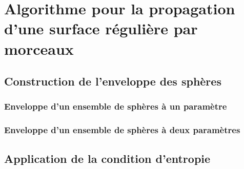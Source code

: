 \chapter{Algorithme pour la propagation d'une surface régulière par morceaux}

\section{Construction de l'enveloppe des sphères}

\subsection{Enveloppe d'un ensemble de sphères à un paramètre}
\cite{peternell1997}


\subsection{Enveloppe d'un ensemble de sphères à deux paramètres}
\cite{gelston1995}


\section{Application de la condition d'entropie}
